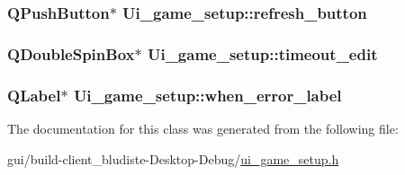\hypertarget{classUi__game__setup_a1982cdaf064bb3a8f784254050159973}{
\subsubsection[{refresh\-\_\-button}]{\setlength{\rightskip}{0pt plus 5cm}Q\-Push\-Button$\ast$ Ui\-\_\-game\-\_\-setup\-::refresh\-\_\-button}}\label{classUi__game__setup_a1982cdaf064bb3a8f784254050159973}
\hypertarget{classUi__game__setup_a40da11a9746d8882462ed1f493c193b2}{
\subsubsection[{timeout\-\_\-edit}]{\setlength{\rightskip}{0pt plus 5cm}Q\-Double\-Spin\-Box$\ast$ Ui\-\_\-game\-\_\-setup\-::timeout\-\_\-edit}}\label{classUi__game__setup_a40da11a9746d8882462ed1f493c193b2}
\hypertarget{classUi__game__setup_af02f3182e60b85fbd75f65937fe46c91}{
\subsubsection[{when\-\_\-error\-\_\-label}]{\setlength{\rightskip}{0pt plus 5cm}Q\-Label$\ast$ Ui\-\_\-game\-\_\-setup\-::when\-\_\-error\-\_\-label}}\label{classUi__game__setup_af02f3182e60b85fbd75f65937fe46c91}


The documentation for this class was generated from the following file\-:\begin{DoxyCompactItemize}
\item 
gui/build-\/client\-\_\-bludiste-\/\-Desktop-\/\-Debug/\hyperlink{ui__game__setup_8h}{ui\-\_\-game\-\_\-setup.\-h}\end{DoxyCompactItemize}
